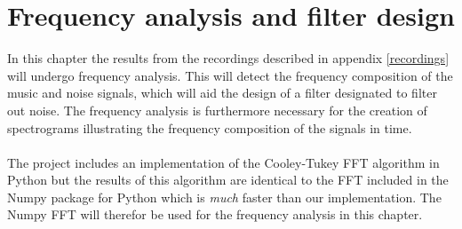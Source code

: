 \chapter{Frequency analysis and filter design} \label{ch9}
In this chapter the results from the recordings described in appendix \ref{recordings} will undergo frequency analysis. This will detect the frequency composition of the music and noise signals, which will aid the design of a filter designated to filter out noise. The frequency analysis is furthermore necessary for the creation of spectrograms illustrating the frequency composition of the signals in time. \\ \\
The project includes an implementation of the Cooley-Tukey FFT algorithm in Python but the results of this algorithm are identical to the FFT included in the Numpy package for Python which is \textit{much} faster than our implementation. The Numpy FFT will therefor be used for the frequency analysis in this chapter.


